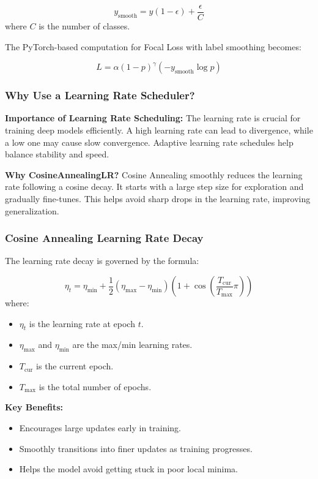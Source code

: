 \[
y_{\text{smooth}} = y(1 - \epsilon) + \frac{\epsilon}{C}
\]
where $C$ is the number of classes.

The PyTorch-based computation for Focal Loss with label smoothing becomes:

\[
L = \alpha (1 - p)^{\gamma} (-y_{\text{smooth}} \log p)
\]

\subsubsection{Why Use a Learning Rate Scheduler?}
\textbf{Importance of Learning Rate Scheduling:} The learning rate is crucial for training deep models efficiently. A high learning rate can lead to divergence, while a low one may cause slow convergence. Adaptive learning rate schedules help balance stability and speed.

\textbf{Why CosineAnnealingLR?} Cosine Annealing smoothly reduces the learning rate following a cosine decay. It starts with a large step size for exploration and gradually fine-tunes. This helps avoid sharp drops in the learning rate, improving generalization.

\subsubsection{Cosine Annealing Learning Rate Decay}
The learning rate decay is governed by the formula:

\[
\eta_t = \eta_{\min} + \frac{1}{2} (\eta_{\max} - \eta_{\min}) \left( 1 + \cos\left( \frac{T_{\text{cur}}}{T_{\text{max}}} \pi \right) \right)
\]
where:
\begin{itemize}
    \item $\eta_t$ is the learning rate at epoch $t$.
    \item $\eta_{\max}$ and $\eta_{\min}$ are the max/min learning rates.
    \item $T_{\text{cur}}$ is the current epoch.
    \item $T_{\text{max}}$ is the total number of epochs.
\end{itemize}

\textbf{Key Benefits:}
\begin{itemize}
    \item Encourages large updates early in training.
    \item Smoothly transitions into finer updates as training progresses.
    \item Helps the model avoid getting stuck in poor local minima.
\end{itemize}

